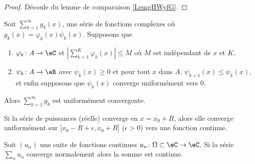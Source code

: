 \begin{proof}
    Découle du lemme de comparaison \ref{LemgHWyfG}.
\end{proof}

\begin{theorem}				\label{ThoSerCritAbel}
	Soit $\sum_{k=1}^{\infty}g_k(x)$, une série de fonctions complexes où $g_k(x)=\varphi_k(x)\psi_k(x)$. Supposons que
	\begin{enumerate}

		\item
			$\varphi_k\colon A\to \eC$ et $| \sum_{k=1}^K\varphi_k(x) |\leq M$ où $M$ est indépendant de $x$ et $K$,
		\item
			$\psi_k\colon A\to \eR$ avec $\psi_k(x)\geq 0$ et pour tout $x$ dans $A$, $\psi_{k+1}(x)\leq \psi_k(x)$, et enfin supposons que $\psi_k(x)$ converge uniformément vers $0$.

	\end{enumerate}
	Alors $\sum_{k=1}^{\infty}g_k$ est uniformément convergente.
\end{theorem}

\begin{theorem}		\label{ThoAbelSeriePuiss}
	Si la série de puissances (réelle) converge en $x=x_0+R$, alors elle converge uniformément sur $\mathopen[ x_0-R+\epsilon , x_0+R \mathclose]$ ($\epsilon>0$) vers une fonction continue.
\end{theorem}


\begin{proposition}     \label{PropUEMoNF}
    Soit \( (u_n)\) une suite de fonctions continues \( u_n\colon \Omega\subset\eC\to \eC\). Si la série \( \sum_nu_n\) converge normalement alors la somme est continue.
\end{proposition}

